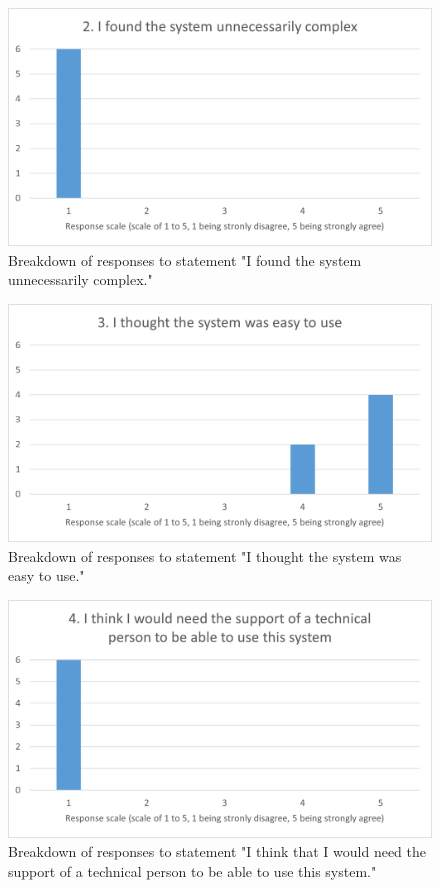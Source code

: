 \documentclass{l4proj}
\begin{document}
\begin{appendices}
\begin{figure}[h]
    \centering
    \includegraphics[width=0.7\linewidth]{images/upload/sus_results/q2.png}
    \caption{Breakdown of responses to statement "I found the system unnecessarily complex."}
    \label{fig:q2}
\end{figure}

\begin{figure}[h]
    \centering
    \includegraphics[width=0.7\linewidth]{images/upload/sus_results/q3.png}
    \caption{Breakdown of responses to statement "I thought the system was easy to use."}
    \label{fig:q3}
\end{figure}

\begin{figure}[h]
    \centering
    \includegraphics[width=0.7\linewidth]{images/upload/sus_results/q4.png}
    \caption{Breakdown of responses to statement "I think that I would need the support of a technical person to be able to use this system."}
    \label{fig:q4}
\end{figure}


\end{appendices}
\end{document}
